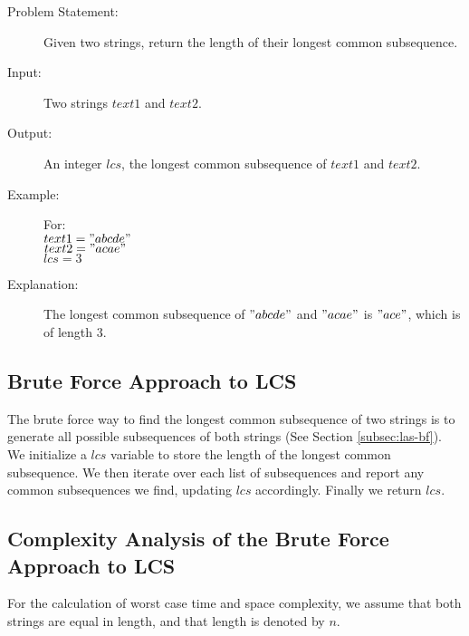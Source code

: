 \begin{description}
    \item[Problem Statement:]
        Given two strings, return the length of their longest common subsequence.

    \item[Input:] 
        Two strings $text1$ and $text2$.
    \item[Output:] 
        An integer $lcs$, the longest common subsequence of $text1$ and $text2$.
        
    \item[Example:] For:\\
        $text1 = "abcde"$\\
        $text2 = "acae"$\\
        $lcs = 3$

    \item[Explanation:]
        The longest common subsequence of $"abcde"$ and $"acae"$ is $"ace"$, which is of length $3$.
   
\end{description}

\subsection{Brute Force Approach to LCS}
The brute force way to find the longest common subsequence of two strings is to generate all possible subsequences of both strings (See Section \ref{subsec:las-bf}).
We initialize a $lcs$ variable to store the length of the longest common subsequence.
We then iterate over each list of subsequences and report any common subsequences we find, updating $lcs$ accordingly.
Finally we return $lcs$. 
\subsection{Complexity Analysis of the Brute Force Approach to LCS}
For the calculation of worst case time and space complexity, we assume that both strings are equal in length, and that length is denoted by $n$.

